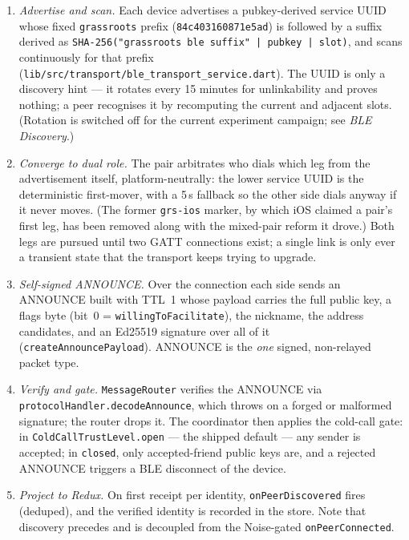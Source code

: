 \documentclass[11pt]{report}
\newcommand{\code}[1]{\texttt{\small #1}}
\begin{document}
\begin{enumerate}
  \item \emph{Advertise and scan.} Each device advertises a pubkey-derived
    service UUID whose fixed \code{grassroots} prefix (\code{84c403160871e5ad})
    is followed by a suffix derived as
    \code{SHA-256("grassroots ble suffix" | pubkey | slot)}, and scans
    continuously for that prefix
    (\code{lib/src/transport/ble\_transport\_service.dart}). The UUID is only a
    discovery hint --- it rotates every 15 minutes for unlinkability and proves
    nothing; a peer recognises it by recomputing the current and adjacent slots.
    (Rotation is switched off for the current experiment campaign; see
    \emph{BLE Discovery}.)
  \item \emph{Converge to dual role.} The pair arbitrates who dials which leg
    from the advertisement itself, platform-neutrally: the lower service UUID is
    the deterministic first-mover, with a 5\,s fallback so the other side dials
    anyway if it never moves. (The former \code{grs-ios} marker, by which iOS
    claimed a pair's first leg, has been removed along with the mixed-pair
    reform it drove.) Both legs are pursued until two GATT
    connections exist; a single link is only ever a transient state that the
    transport keeps trying to upgrade.
  \item \emph{Self-signed ANNOUNCE.} Over the connection each side sends an
    ANNOUNCE built with TTL~1 whose payload carries the full public key, a flags
    byte (bit~0 = \code{willingToFacilitate}), the nickname, the address
    candidates, and an Ed25519 signature over all of it
    (\code{createAnnouncePayload}). ANNOUNCE is the \emph{one} signed,
    non-relayed packet type.
  \item \emph{Verify and gate.} \code{MessageRouter} verifies the ANNOUNCE via
    \code{protocolHandler.decodeAnnounce}, which throws on a forged or malformed
    signature; the router drops it. The coordinator then applies the cold-call
    gate: in \code{ColdCallTrustLevel.open} --- the shipped default --- any
    sender is accepted; in \code{closed}, only accepted-friend public keys are,
    and a rejected ANNOUNCE triggers a BLE disconnect of the device.
  \item \emph{Project to Redux.} On first receipt per identity,
    \code{onPeerDiscovered} fires (deduped), and the verified identity is
    recorded in the store. Note that discovery precedes and is decoupled from
    the Noise-gated \code{onPeerConnected}.
\end{enumerate}
\end{document}
